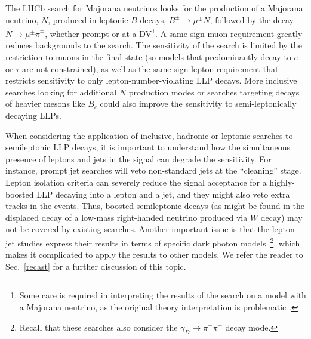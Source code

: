 The LHCb search for Majorana neutrinos \cite{Aaij:2014aba} looks for the production of a Majorana neutrino, $N$, produced in leptonic $B$ decays, $B^\pm\rightarrow \mu^\pm N$, followed by the  decay $N\rightarrow \mu^\pm\pi^\mp$, whether prompt or at a DV\footnote{Some care is required in interpreting the results of the search on a model with a Majorana neutrino, as the original theory interpretation is problematic \cite{Shuve:2016muy}.}. A same-sign muon requirement greatly reduces backgrounds to the search. The sensitivity of the search is limited by the restriction to muons in the final state (so models that predominantly decay to $e$ or $\tau$ are not constrained), as well as the same-sign lepton requirement that restricts sensitivity to only lepton-number-violating LLP decays. More inclusive searches looking for additional $N$ production modes \cite{Gorbunov:2007ak} or searches targeting decays of heavier mesons like $B_c$ \cite{Milanes:2016rzr} could also improve the sensitivity to semi-leptonically decaying LLPs.

When considering the application of inclusive, hadronic or leptonic searches to semileptonic LLP decays, it is important to understand how the simultaneous presence of leptons and jets in the signal can degrade the sensitivity. For instance, prompt jet searches will veto non-standard jets at the ``cleaning'' stage. Lepton isolation criteria can severely reduce the signal acceptance for a highly-boosted LLP decaying into a lepton and a jet, and they might also veto extra tracks in the events. Thus,  boosted semileptonic decays (as might be found in the displaced decay of a low-mass right-handed neutrino produced via $W$ decay) may not be covered by existing searches.
Another important issue is that the lepton-jet studies express their results in terms of specific dark photon models~\footnote{Recall that these searches also consider the $\gamma_D \to \pi^+ \pi^-$ decay mode.}, which makes it complicated to apply the results to other models. We refer the reader to Sec.~\ref{recast} for a further discussion of this topic.

